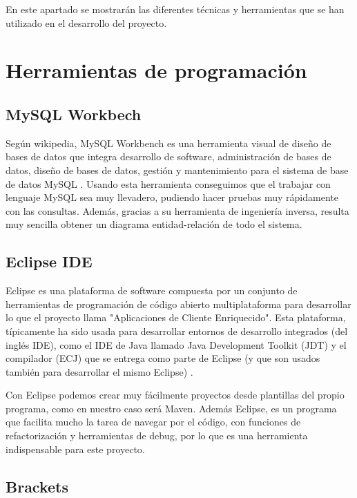 
En este apartado se mostrarán las diferentes técnicas y herramientas que se han utilizado en el desarrollo del proyecto.

\section{Herramientas de programación}

\subsection{MySQL Workbech}

Según wikipedia, MySQL Workbench es una herramienta visual de diseño de bases de datos que integra desarrollo de software, administración de bases de datos, diseño de bases de datos, gestión y mantenimiento para el sistema de base de datos MySQL \cite{wiki:Workbench}. Usando esta herramienta conseguimos que el trabajar con lenguaje MySQL sea muy llevadero, pudiendo hacer pruebas muy rápidamente con las consultas. Además, gracias a su herramienta de ingeniería inversa, resulta muy sencilla obtener un diagrama entidad-relación de todo el sistema.

\subsection{Eclipse IDE}

Eclipse es una plataforma de software compuesta por un conjunto de herramientas de programación de código abierto multiplataforma para desarrollar lo que el proyecto llama "Aplicaciones de Cliente Enriquecido". Esta plataforma, típicamente ha sido usada para desarrollar entornos de desarrollo integrados (del inglés IDE), como el IDE de Java llamado Java Development Toolkit (JDT) y el compilador (ECJ) que se entrega como parte de Eclipse (y que son usados también para desarrollar el mismo Eclipse) \cite{wiki:Eclipse}.

Con Eclipse podemos crear muy fácilmente proyectos desde plantillas del propio programa, como en nuestro caso será Maven. Además Eclipse, es un programa que facilita mucho la tarea de navegar por el código, con funciones de refactorización y herramientas de debug, por lo que es una herramienta indispensable para este proyecto.

\subsection{Brackets}

